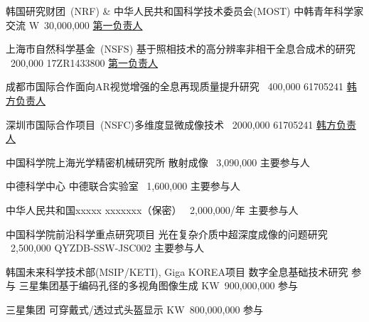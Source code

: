 \documentclass[10pt,a4paper]{moderncv}
\begin{document}
{韩国研究财团~(NRF) \& 中华人民共和国科学技术委员会(MOST)}
{中韩青年科学家交流}
{W~30,000,000}{}
{\underline{第一负责人}}

{上海市自然科学基金~(NSFS)}
{基于照相技术的高分辨率非相干全息合成术的研究}
{\textyen~200,000}
{17ZR1433800}
{\underline{第一负责人}}

{成都市国际合作}{面向AR视觉增强的全息再现质量提升研究}
{\textyen~400,000}
{61705241}
{\underline{韩方负责人}}

{深圳市国际合作项目~(NSFC)}{多维度显微成像技术}
{\textyen~2000,000}
{61705241}
{\underline{韩方负责人}}


{中国科学院上海光学精密机械研究所}
{散射成像}
{\textyen~3,090,000}
{}
{主要参与人}

{中德科学中心}
{中德联合实验室}
{\textyen~1,600,000}
{}
{主要参与人}

{中华人民共和国xxxxx}
{xxxxxxx（保密）}
{\textyen~2,000,000/年}
{}
{主要参与人}

{中国科学院前沿科学重点研究项目}
{光在复杂介质中超深度成像的问题研究}
{\textyen~2,500,000}
{QYZDB-SSW-JSC002}
{主要参与人}


{韩国未来科学技术部(MSIP/KETI), Giga KOREA项目}
{数字全息基础技术研究}
{}
{}
{参与}
%
%
{三星集团}{基于编码孔径的多视角图像生成}
{{KW}~900,000,000}
{}
{参与}

{三星集团}
{可穿戴式/透过式头盔显示}
{{KW}~800,000,000}
{}
{参与}
%

\end{document}
